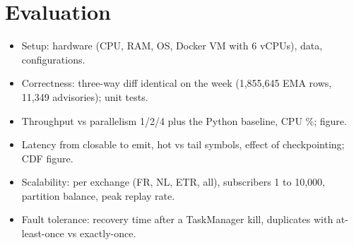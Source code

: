 \section{Evaluation}
\label{sec:evaluation}

\begin{itemize}
  \item Setup: hardware (CPU, RAM, OS, Docker VM with 6 vCPUs), data, configurations.
  \item Correctness: three-way diff identical on the week (1,855,645 EMA rows, 11,349 advisories); unit tests.
  \item Throughput vs parallelism 1/2/4 plus the Python baseline, CPU \%; figure.
  \item Latency from closable to emit, hot vs tail symbols, effect of checkpointing; CDF figure.
  \item Scalability: per exchange (FR, NL, ETR, all), subscribers 1 to 10,000, partition balance, peak replay rate.
  \item Fault tolerance: recovery time after a TaskManager kill, duplicates with at-least-once vs exactly-once.
\end{itemize}
